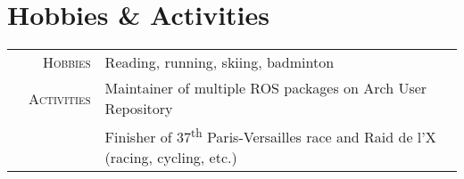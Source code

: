 \documentclass[a4paper,10pt]{article} %
\begin{document}

\section{Hobbies \& Activities}

\begin{tabular}{p{0.153cm}rp{15cm}}

& \textsc{Hobbies} & Reading, running, skiing, badminton \vspace{0.1cm} \\
& \textsc{Activities} & Maintainer of multiple ROS packages on Arch User Repository \\
& & Finisher of 37\textsuperscript{th} Paris-Versailles race and Raid de l'X (racing, cycling, etc.) \\

\end{tabular}









\end{document}
